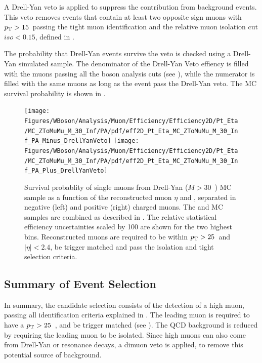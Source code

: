 A Drell-Yan veto is applied to suppress the contribution from \DYToMuMu background events. This veto removes events that contain at least two opposite sign muons with $p_{\mathrm{T}} > 15$~\GeVc passing the tight muon identification and the relative muon isolation cut $iso < 0.15$, defined in  .

The probability that Drell-Yan events survive the veto is checked using a Drell-Yan simulated sample. The denominator of the Drell-Yan Veto effiency is filled with the muons passing all the \W boson  analysis cuts (see ), while the numerator is filled with the same muons as long as the event pass the Drell-Yan veto. The MC survival probability is shown in .

\begin{figure}[htb]
 \begin{center}
   \texttt{[image: Figures/WBoson/Analysis/Muon/Efficiency/Efficiency2D/Pt\_Eta/MC\_ZToMuMu\_M\_30\_Inf/PA/pdf/eff2D\_Pt\_Eta\_MC\_ZToMuMu\_M\_30\_Inf\_PA\_Minus\_DrellYanVeto]}
   \texttt{[image: Figures/WBoson/Analysis/Muon/Efficiency/Efficiency2D/Pt\_Eta/MC\_ZToMuMu\_M\_30\_Inf/PA/pdf/eff2D\_Pt\_Eta\_MC\_ZToMuMu\_M\_30\_Inf\_PA\_Plus\_DrellYanVeto]}
   \caption{Survival probablity of single muons from Drell-Yan ($M > 30$~\GeVcc) MC sample  as a function of the reconstructed muon $\eta$ and \pt, separated in negative (left) and positive (right) charged muons. The \pPb and \Pbp MC samples are combined as described in . The relative statistical efficiency uncertainties scaled by 100 are shown for the two highest \pt bins. Reconstructed muons are required to be within $p_{\mathrm{T}} > 25$~\GeVc and $|\eta| < 2.4$, be trigger matched and pass the isolation and tight selection criteria.}
   \label{fig:DrellYanVetoZEfficiency2D}
 \end{center}
\end{figure}


\subsection{Summary of Event Selection} \label{sec:WBoson_Selection_WSelection}

In summary, the \W candidate selection consists of the detection of a high \pt muon, passing all identification criteria explained in . The leading muon is required to have a $p_{\mathrm{T}} > 25$~\GeVc, and be trigger matched (see ). The QCD background is reduced by requiring the leading muon to be isolated. Since high \pt muons can also come from Drell-Yan or resonance decays, a dimuon veto is applied, to remove this potential source of background.


